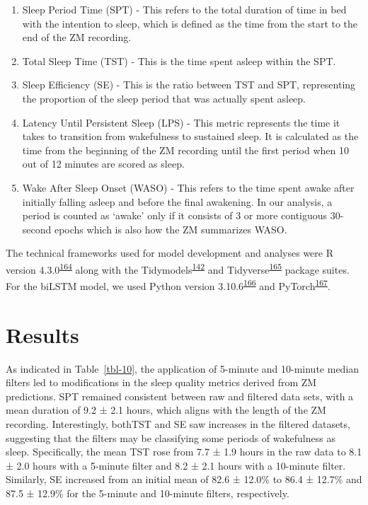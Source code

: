 \documentclass[
  10pt,
]{scrbook}
\providecommand{\tightlist}{%
  \setlength{\itemsep}{0pt}\setlength{\parskip}{0pt}}\usepackage{longtable,booktabs,array}
\begin{document}
\begin{enumerate}
\def\labelenumi{\arabic{enumi}.}
\tightlist
\item
  Sleep Period Time (SPT) - This refers to the total duration of time in
  bed with the intention to sleep, which is defined as the time from the
  start to the end of the ZM recording.
\item
  Total Sleep Time (TST) - This is the time spent asleep within the SPT.
\item
  Sleep Efficiency (SE) - This is the ratio between TST and SPT,
  representing the proportion of the sleep period that was actually
  spent asleep.
\item
  Latency Until Persistent Sleep (LPS) - This metric represents the time
  it takes to transition from wakefulness to sustained sleep. It is
  calculated as the time from the beginning of the ZM recording until
  the first period when 10 out of 12 minutes are scored as sleep.
\item
  Wake After Sleep Onset (WASO) - This refers to the time spent awake
  after initially falling asleep and before the final awakening. In our
  analysis, a period is counted as `awake' only if it consists of 3 or
  more contiguous 30-second epochs which is also how the ZM summarizes
  WASO.
\end{enumerate}

The technical frameworks used for model development and analyses were R
version
4.3.0\textsuperscript{\protect\hyperlink{ref-rcoreteam_2023}{164}} along
with the
Tidymodels\textsuperscript{\protect\hyperlink{ref-kuhn_tidymodels_2020}{142}}
and
Tidyverse\textsuperscript{\protect\hyperlink{ref-wickham_tidyverse_2019}{165}}
package suites. For the biLSTM model, we used Python version
3.10.6\textsuperscript{\protect\hyperlink{ref-vanrossum_python_2009}{166}}
and
PyTorch\textsuperscript{\protect\hyperlink{ref-paszke_pytorch_2019}{167}}.

\hypertarget{results-2}{%
\section{Results}\label{results-2}}

As indicated in Table~\ref{tbl-10}, the application of 5-minute and
10-minute median filters led to modifications in the sleep quality
metrics derived from ZM predictions. SPT remained consistent between raw
and filtered data sets, with a mean duration of 9.2 ± 2.1 hours, which
aligns with the length of the ZM recording. Interestingly, bothTST and
SE saw increases in the filtered datasets, suggesting that the filters
may be classifying some periods of wakefulness as sleep. Specifically,
the mean TST rose from 7.7 ± 1.9 hours in the raw data to 8.1 ± 2.0
hours with a 5-minute filter and 8.2 ± 2.1 hours with a 10-minute
filter. Similarly, SE increased from an initial mean of 82.6 ± 12.0\% to
86.4 ± 12.7\% and 87.5 ± 12.9\% for the 5-minute and 10-minute filters,
respectively.
\end{document}
